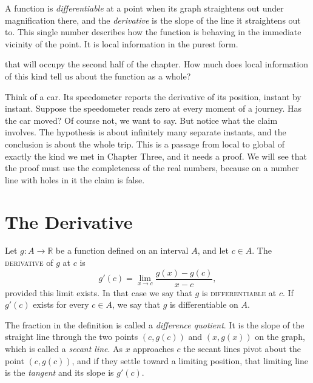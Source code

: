 A function is \emph{differentiable} at a point when its graph straightens out under magnification there, and the \emph{derivative} is the slope of the line it straightens out to.  This single number describes how the function is behaving in the immediate vicinity of the point.  It is local information in the purest form.

 that will occupy the second half of the chapter.  How much does local information of this kind tell us about the function as a whole?

Think of a car.  Its speedometer reports the derivative of its position, instant by instant.  Suppose the speedometer reads zero at every moment of a journey.  Has the car moved?  Of course not, we want to say.  But notice what the claim involves.  The hypothesis is about infinitely many separate instants, and the conclusion is about the whole trip.  This is a passage from local to global of exactly the kind we met in Chapter Three, and it needs a proof.  We will see that the proof must use the completeness of the real numbers, because on a number line with holes in it the claim is false.

\section{The Derivative}

\begin{definition}\label{def:derivative}
Let $g : A \to \mathbb{R}$ be a function defined on an interval $A$, and let $c \in A$.  The \textsc{derivative} of $g$ at $c$ is
\[ g'(c) = \lim_{x \to c} \frac{g(x) - g(c)}{x - c}, \]
provided this limit exists.  In that case we say that $g$ is \textsc{differentiable} at $c$.  If $g'(c)$ exists for every $c \in A$, we say that $g$ is differentiable on $A$.
\end{definition}

The fraction in the definition is called a \emph{difference quotient}.  It is the slope of the straight line through the two points $(c, g(c))$ and $(x, g(x))$ on the graph, which is called a \emph{secant line}.  As $x$ approaches $c$ the secant lines pivot about the point $(c, g(c))$, and if they settle toward a limiting position, that limiting line is the \emph{tangent} and its slope is $g'(c)$.

